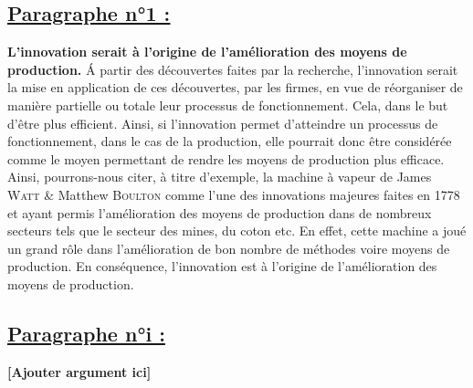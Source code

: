 \subsection*{\underline{\hyperref[item-UAO-M1]{Paragraphe n°1 :}}}

\noindent \textbf{L'innovation serait à l'origine de l'amélioration des moyens de production.} \'A partir des découvertes faites par la recherche, l'innovation serait la mise en application de ces découvertes, par les firmes, en vue de réorganiser de manière partielle ou totale leur processus de fonctionnement. Cela, dans le but d'être plus efficient. Ainsi, si l'innovation permet d'atteindre un processus de fonctionnement, dans le cas de la production, elle pourrait donc être considérée comme le moyen permettant de rendre les moyens de production plus efficace. Ainsi, pourrons-nous citer, à titre d'exemple, la machine à vapeur de James \textsc{Watt} \& Matthew \textsc{Boulton} comme l'une des innovations majeures faites en 1778 et ayant permis l'amélioration des moyens de production dans de nombreux secteurs tels que le secteur des mines, du coton etc. En effet, cette machine a joué un grand rôle dans l'amélioration de bon nombre de méthodes voire moyens de production. En conséquence, l'innovation est à l'origine de l'amélioration des moyens de production.

\subsection*{\underline{Paragraphe n°i :}}

\noindent \textbf{[Ajouter argument ici]}